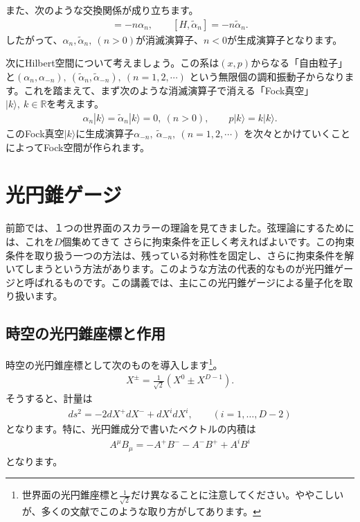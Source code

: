\documentclass[report,paper=a4, fontsize=12pt, line_length=16cm, number_of_lines=34,dvipdfmx]{jlreq}
\numberwithin{equation}{chapter}
\numberwithin{equation}{section}
\newcommand{\Rb}{\mathbb{R}}
\newcommand{\alphat}{\tilde{\alpha}}
\begin{document}
また、次のような交換関係が成り立ちます。
\begin{align}
  [H,\alpha_{n}]=-n\alpha_{n},\qquad [H,\alphat_{n}]=-n\alphat_{n}.
\end{align}
したがって、$\alpha_{n},\alphat_{n},\ (n>0)$が消滅演算子、$n<0$が生成演算子となります。

次にHilbert空間について考えましょう。この系は$(x,p)$からなる「自由粒子」と$(\alpha_n,\alpha_{-n}), \ (\alphat_n,\alphat_{-n}),\ (n=1,2,\cdots)$ という無限個の調和振動子からなります。これを踏まえて、まず次のような消滅演算子で消える「Fock真空」$|k\rangle,\ k\in \Rb$を考えます。
\begin{align}
\alpha_n|k\rangle=\alphat_n|k\rangle=0, \ (n>0),\qquad p|k\rangle=k |k\rangle.
\end{align}
このFock真空$|k\rangle$に生成演算子$\alpha_{-n},\ \alphat_{-n},\ (n=1,2,\cdots)$ を次々とかけていくことによってFock空間が作られます。

\section{光円錐ゲージ}
前節では、１つの世界面のスカラーの理論を見てきました。弦理論にするためには、これを$D$個集めてきて
さらに拘束条件を正しく考えればよいです。この拘束条件を取り扱う一つの方法は、残っている対称性を固定し、さらに拘束条件を解いてしまうという方法があります。このような方法の代表的なものが光円錐ゲージと呼ばれるものです。この講義では、主にこの光円錐ゲージによる量子化を取り扱います。

\subsection{時空の光円錐座標と作用}
時空の光円錐座標として次のものを導入します\footnote{世界面の光円錐座標と$\frac{1}{\sqrt{2}}$だけ異なることに注意してください。ややこしいが、多くの文献でこのような取り方がしてあります。}。
\begin{align}
X^{\pm}=\frac{1}{\sqrt{2}} (X^0\pm X^{D-1}).
\end{align}
そうすると、計量は
\begin{align}
ds^2=-2dX^{+}dX^{-}+dX^{i}dX^{i},\qquad (i=1,\dots,D-2)
\end{align}
となります。特に、光円錐成分で書いたベクトルの内積は
\begin{align}
A^{\mu}B_{\mu}=-A^{+}B^{-}-A^{-}B^{+}+A^{i}B^{i}
\end{align}
となります。
\end{document}
